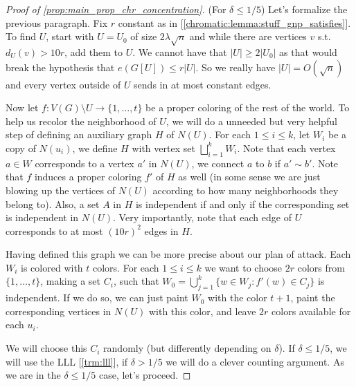 \begin{proof}[Proof of \ref{prop:main_prop_chr_concentration}]
	(For $\delta \leq 1/5$)
	Let's formalize the previous paragraph. Fix $r$ constant as in
	[\ref{chromatic:lemma:stuff_gnp_satisfies}]. To find $U$, start with
	$U = U_0$ of size $2\lambda\sqrt{n}$ and while there are vertices
	$v$ s.t. $d_U(v) > 10r$, add them to $U$. We cannot have that $|U|
	\geq 2 |U_0|$ as that would break the hypothesis that $e(G[U]) \leq r|U|$.
	So we really have $|U| = O(\sqrt{n})$ and every vertex outside of
	$U$ sends in at most constant edges.

	Now let $f : V(G) \setminus U \to \{1,\dots, t\}$ be a proper
	coloring of the rest of the world. To help us recolor the
	neighborhood of $U$, we will do a
	unneeded but very helpful step of defining an auxiliary graph $H$ of
	$N(U)$. For each $1 \leq i \leq k$, let $W_i$ be a copy of $N(u_i)$,
	we define $H$
	with vertex set $\bigsqcup_{i = 1}^k W_i$. Note that each vertex $a
	\in W$ corresponds to a vertex $a'$ in $N(U)$, we connect $a$ to $b$
	if $a' \sim b'$.
	Note that $f$ induces a proper coloring $f'$ of $H$ as well (in some
		sense we are just blowing up the vertices of $N(U)$ according to how
	many neighborhoods they belong to).
	Also, a set $A$ in $H$ is independent if and only if the
	corresponding set is independent in $N(U)$. Very importantly, note
	that each edge of $U$ corresponds to
	at most $(10r)^2$ edges in $H$.

	Having defined this graph we can be more precise about our plan of
	attack. Each $W_i$ is colored with $t$ colors.
	For each $1 \leq i \leq k$ we want to choose $2r$ colors from $\{1,
	\dots, t\}$, making a set $C_i$, such that $W_0 = \bigcup_{j = 1}^k
	\{w \in W_j : f'(w) \in C_j\}$ is independent.
	If we do so, we can just paint $W_0$ with the color $t+1$, paint the
	corresponding vertices in $N(U)$ with this color, and leave $2r$
	colors available for each $u_i$.

	We will choose this $C_i$ randomly
	(but differently depending on $\delta$). If $\delta \leq 1/5$,
	we will use the LLL [\ref{trm:lll}], if $\delta > 1/5$ we will do a
	clever counting argument. As we are in the $\delta \leq 1/5$ case,
	let's proceed.


\end{proof}
